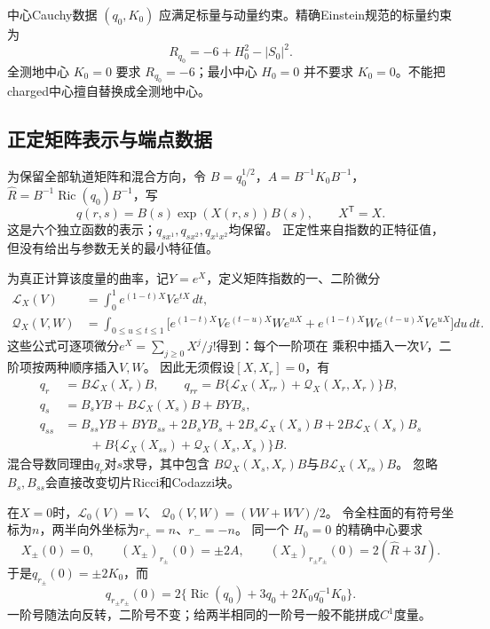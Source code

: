 \documentclass[UTF8,a4paper,11pt,fontset=fandol]{ctexart}
\numberwithin{equation}{section}
\theoremstyle{definition}
\newcommand{\Ric}{\operatorname{Ric}}
\begin{document}
中心Cauchy数据 $(q_0,K_0)$ 应满足标量与动量约束。精确Einstein规范的标量约束为
\[
R_{q_0}=-6+H_0^2-|S_0|^2.
\]
全测地中心 $K_0=0$ 要求 $R_{q_0}=-6$；最小中心 $H_0=0$ 并不要求 $K_0=0$。不能把charged中心擅自替换成全测地中心。

\subsection{正定矩阵表示与端点数据}
为保留全部轨道矩阵和混合方向，令 $B=q_0^{1/2}$，$A=B^{-1}K_0B^{-1}$，$\widehat R=B^{-1}\Ric(q_0)B^{-1}$，写
\begin{equation}\label{eq:matrix-exponential-metric}
 q(r,s)=B(s)\exp(X(r,s))B(s),\qquad X^{\mathsf T}=X.
\end{equation}
这是六个独立函数的表示；$q_{sx^1},q_{sx^2},q_{x^1x^2}$均保留。
正定性来自指数的正特征值，但没有给出与参数无关的最小特征值。

为真正计算该度量的曲率，记$Y=e^X$，定义矩阵指数的一、二阶微分
\begin{align}
 \mathcal L_X(V)&=\int_0^1e^{(1-t)X}Ve^{tX}\,dt,\label{eq:exp-first}\\
 \mathcal Q_X(V,W)&=\int_{0\le u\le t\le1}
 \bigl[e^{(1-t)X}Ve^{(t-u)X}We^{uX}
       +e^{(1-t)X}We^{(t-u)X}Ve^{uX}\bigr]du\,dt.
 \label{eq:exp-second}
\end{align}
这些公式可逐项微分$e^X=\sum_{j\ge0}X^j/j!$得到：每个一阶项在
乘积中插入一次$V$，二阶项按两种顺序插入$V,W$。
因此无须假设$[X,X_r]=0$，有
\begin{align}
 q_r&=B\mathcal L_X(X_r)B,\qquad
 q_{rr}=B\{\mathcal L_X(X_{rr})+\mathcal Q_X(X_r,X_r)\}B,
 \label{eq:exp-radial}\\
 q_s&=B_sYB+B\mathcal L_X(X_s)B+BYB_s,\nonumber\\
 q_{ss}&=B_{ss}YB+BYB_{ss}+2B_sYB_s
       +2B_s\mathcal L_X(X_s)B+2B\mathcal L_X(X_s)B_s\nonumber\\
 &\hspace{2em}+B\{\mathcal L_X(X_{ss})+\mathcal Q_X(X_s,X_s)\}B.
 \label{eq:exp-spatial}
\end{align}
混合导数同理由$q_r$对$s$求导，其中包含
$B\mathcal Q_X(X_s,X_r)B$与$B\mathcal L_X(X_{rs})B$。
忽略$B_s,B_{ss}$会直接改变切片Ricci和Codazzi块。

在$X=0$时，$\mathcal L_0(V)=V$、
$\mathcal Q_0(V,W)=(VW+WV)/2$。
令全柱面的有符号坐标为$n$，两半向外坐标为$r_+=n$、$r_-=-n$。
同一个 $H_0=0$ 的精确中心要求
\begin{equation}\label{eq:matrix-center-jets}
 X_\pm(0)=0,\qquad (X_\pm)_{r_\pm}(0)=\pm2A,\qquad
 (X_\pm)_{r_\pm r_\pm}(0)=2(\widehat R+3I).
\end{equation}
于是$q_{r_\pm}(0)=\pm2K_0$，而
\[
 q_{r_\pm r_\pm}(0)
 =2\{\Ric(q_0)+3q_0+2K_0q_0^{-1}K_0\}.
\]
一阶号随法向反转，二阶号不变；给两半相同的一阶号一般不能拼成$C^1$度量。
\end{document}
